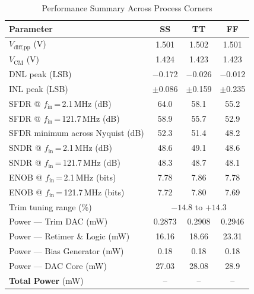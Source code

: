 \documentclass[lettersize,journal]{IEEEtran}
\begin{document}
\begin{table}[!h]
  \renewcommand{\arraystretch}{1.2}
  \caption{Performance Summary Across Process Corners}
  \label{tab:perf}
  \centering
  \begin{tabular}{lccc}
    \toprule
    \textbf{Parameter} & \textbf{SS} & \textbf{TT} & \textbf{FF} \\
    \midrule
    $V_\text{diff,pp}$ (V)                        & 1.501 & 1.502 & 1.501 \\
    $V_\text{CM}$ (V)                             & 1.424 & 1.423 & 1.423 \\
    \midrule
    DNL peak (LSB)                                & $-$0.172 & $-$0.026 & $-$0.012 \\
    INL peak (LSB)                                & $\pm$0.086 & $\pm$0.159 & $\pm$0.235 \\
    \midrule
    SFDR @ $f_\text{in}$\,=\,2.1\,MHz (dB)       & 64.0  & 58.1  & 55.2  \\
    SFDR @ $f_\text{in}$\,=\,121.7\,MHz (dB)     & 58.9  & 55.7  & 52.9  \\
    SFDR minimum across Nyquist (dB)              & 52.3  & 51.4  & 48.2  \\
    \midrule
    SNDR @ $f_\text{in}$\,=\,2.1\,MHz (dB)       & 48.6  & 49.1  & 48.6  \\
    SNDR @ $f_\text{in}$\,=\,121.7\,MHz (dB)     & 48.3  & 48.7  & 48.1  \\
    \midrule
    ENOB @ $f_\text{in}$\,=\,2.1\,MHz (bits)     & 7.78  & 7.86  & 7.78  \\
    ENOB @ $f_\text{in}$\,=\,121.7\,MHz (bits)   & 7.72  & 7.80  & 7.69  \\
    \midrule
    Trim tuning range (\%)                        & \multicolumn{3}{c}{$-14.8$ to $+14.3$} \\
    \midrule
    Power — Trim DAC     (mW)                & 0.2873 &  0.2908 & 0.2946 \\
    Power — Retimer \& Logic (mW)                & 16.16  & 18.66 & 23.31 \\
    Power — Bias Generator    (mW)                & 0.18 & 0.18 &  0.18\\
    Power — DAC Core         (mW)                & 27.03  & 28.08 & 28.9 \\
    \textbf{Total Power}      (mW)                & -- & -- & -- \\
    \bottomrule
  \end{tabular}
\end{table}
\end{document}
